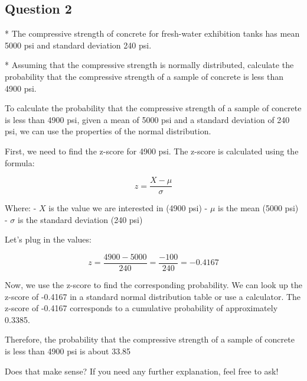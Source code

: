 


\subsection*{Question 2}

* The compressive strength of concrete for fresh-water exhibition tanks has mean 5000 psi and standard deviation 240 psi. 

* Assuming that the compressive strength is normally distributed, calculate the probability that the compressive strength of a sample of concrete is less than 4900 psi.


To calculate the probability that the compressive strength of a sample of concrete is less than 4900 psi, given a mean of 5000 psi and a standard deviation of 240 psi, we can use the properties of the normal distribution.

First, we need to find the z-score for 4900 psi. The z-score is calculated using the formula:

\[ z = \frac{X - \mu}{\sigma} \]

Where:
- \( X \) is the value we are interested in (4900 psi)
- \( \mu \) is the mean (5000 psi)
- \( \sigma \) is the standard deviation (240 psi)

Let's plug in the values:

\[ z = \frac{4900 - 5000}{240} = \frac{-100}{240} = -0.4167 \]

Now, we use the z-score to find the corresponding probability. We can look up the z-score of -0.4167 in a standard normal distribution table or use a calculator. The z-score of -0.4167 corresponds to a cumulative probability of approximately 0.3385.

Therefore, the probability that the compressive strength of a sample of concrete is less than 4900 psi is about 33.85%

Does that make sense? If you need any further explanation, feel free to ask!

